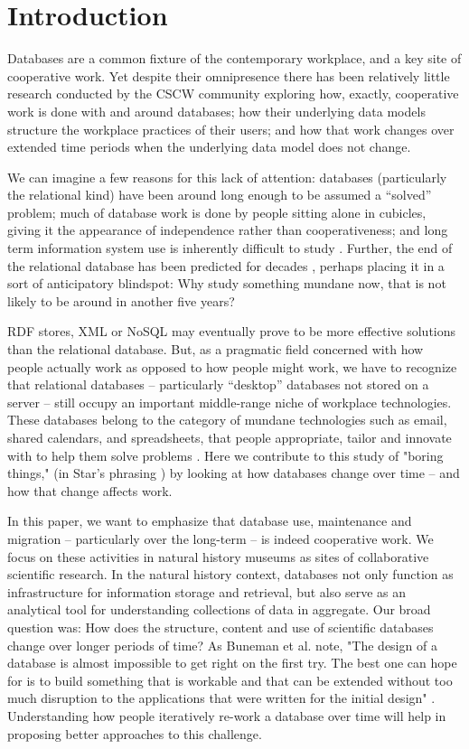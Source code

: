 \section{Introduction}

Databases are a common fixture of the contemporary workplace, and a key site of cooperative work. Yet despite their omnipresence there has been relatively little research conducted by the CSCW community exploring how, exactly, cooperative work is done with and around databases;  how their underlying data models structure the workplace practices of their users; and how that work changes over extended time periods when the underlying data model does not change. 

We can imagine a few reasons for this lack of attention: databases (particularly the relational kind) have been around long enough to be assumed a “solved” problem; much of database work is done by people sitting alone in cubicles, giving it the appearance of independence rather than cooperativeness; and long term information system use is inherently difficult to study \cite{Pipek_2002}. Further, the end of the relational database has been predicted for decades \cite{Atzeni_2013}, perhaps placing it in a sort of anticipatory blindspot: Why study something mundane now, that is not likely to be around in another five years? 

RDF stores, XML or NoSQL may eventually prove to be more effective solutions than the relational database. But, as a pragmatic field concerned with how people actually work as opposed to how people might work, we have to recognize that relational databases – particularly “desktop” databases not stored on a server – still occupy an important middle-range niche of workplace technologies. These databases belong to the category of mundane technologies such as email, shared calendars, and spreadsheets, that people appropriate, tailor and innovate with to help them solve problems  \cite{bellotti2005quality, palen1999social, nardi1991twinkling}. Here we contribute to this study of "boring things," (in Star's phrasing \cite{star1999ethnography}) by looking at how databases change over time -- and how that change affects work.

In this paper, we want to emphasize that database use, maintenance and migration – particularly over the long-term – is indeed cooperative work. We focus on these activities in natural history museums as sites of collaborative scientific research. In the natural history context, databases not only function as infrastructure for information storage and retrieval, but also serve as an analytical tool for understanding collections of data in aggregate. Our broad question was: How does the structure, content and use of scientific databases change over longer periods of time? As Buneman et al. note, "The design of a database is almost impossible to get right on the first try. The best one can hope for is to build something that is workable and that can be extended without too much disruption to the applications that were written for the initial design" \cite{buneman2008curated}. Understanding how people iteratively re-work a database over time will help in proposing better approaches to this challenge.

